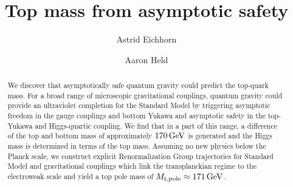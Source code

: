 \documentclass[%
 reprint,
 superscriptaddress,
preprintnumbers,
nofootinbib,
 amsmath,amssymb,
 aps,
prl,
]{revtex4-1}
\begin{document}
\title{
Top mass from asymptotic safety
}
 
 \author{Astrid Eichhorn}
\author{Aaron Held}




\begin{abstract}
We discover that asymptotically safe quantum gravity could predict the top-quark mass. For a  broad range of microscopic gravitational couplings, quantum gravity could provide an ultraviolet completion for the Standard Model by triggering asymptotic freedom in the gauge couplings and bottom Yukawa and asymptotic safety in the top-Yukawa and Higgs-quartic coupling. We find that in a part of this range, a difference of the top and bottom mass of approximately $170\, \rm GeV$ is generated and the Higgs mass is determined in terms of the top mass. Assuming no new physics below the Planck scale, we construct explicit Renormalization Group trajectories for Standard Model and gravitational couplings which link the transplanckian regime to the electroweak scale and yield a top pole mass of $M_\text{t,pole} \approx 171\, \rm GeV$. 
\end{abstract}


\maketitle
\end{document}
